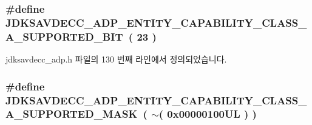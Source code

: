 \subsubsection[{\texorpdfstring{J\+D\+K\+S\+A\+V\+D\+E\+C\+C\+\_\+\+A\+D\+P\+\_\+\+E\+N\+T\+I\+T\+Y\+\_\+\+C\+A\+P\+A\+B\+I\+L\+I\+T\+Y\+\_\+\+C\+L\+A\+S\+S\+\_\+\+A\+\_\+\+S\+U\+P\+P\+O\+R\+T\+E\+D\+\_\+\+B\+IT}{JDKSAVDECC_ADP_ENTITY_CAPABILITY_CLASS_A_SUPPORTED_BIT}}]{\setlength{\rightskip}{0pt plus 5cm}\#define J\+D\+K\+S\+A\+V\+D\+E\+C\+C\+\_\+\+A\+D\+P\+\_\+\+E\+N\+T\+I\+T\+Y\+\_\+\+C\+A\+P\+A\+B\+I\+L\+I\+T\+Y\+\_\+\+C\+L\+A\+S\+S\+\_\+\+A\+\_\+\+S\+U\+P\+P\+O\+R\+T\+E\+D\+\_\+\+B\+IT~( 23 )}\hypertarget{group__adp__entity__capability_ga6480beff00d8dd12ba99ac132d53f0d1}{}\label{group__adp__entity__capability_ga6480beff00d8dd12ba99ac132d53f0d1}


jdksavdecc\+\_\+adp.\+h 파일의 130 번째 라인에서 정의되었습니다.

\subsubsection[{\texorpdfstring{J\+D\+K\+S\+A\+V\+D\+E\+C\+C\+\_\+\+A\+D\+P\+\_\+\+E\+N\+T\+I\+T\+Y\+\_\+\+C\+A\+P\+A\+B\+I\+L\+I\+T\+Y\+\_\+\+C\+L\+A\+S\+S\+\_\+\+A\+\_\+\+S\+U\+P\+P\+O\+R\+T\+E\+D\+\_\+\+M\+A\+SK}{JDKSAVDECC_ADP_ENTITY_CAPABILITY_CLASS_A_SUPPORTED_MASK}}]{\setlength{\rightskip}{0pt plus 5cm}\#define J\+D\+K\+S\+A\+V\+D\+E\+C\+C\+\_\+\+A\+D\+P\+\_\+\+E\+N\+T\+I\+T\+Y\+\_\+\+C\+A\+P\+A\+B\+I\+L\+I\+T\+Y\+\_\+\+C\+L\+A\+S\+S\+\_\+\+A\+\_\+\+S\+U\+P\+P\+O\+R\+T\+E\+D\+\_\+\+M\+A\+SK~( $\sim$( 0x00000100\+U\+L ) )}\hypertarget{group__adp__entity__capability_ga10f4e8c58103317ae2fd13cca5627c3b}{}\label{group__adp__entity__capability_ga10f4e8c58103317ae2fd13cca5627c3b}


